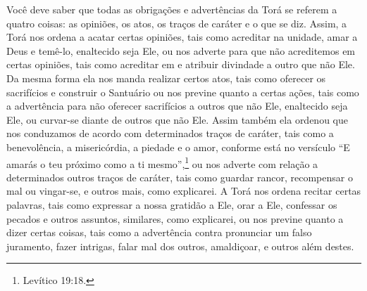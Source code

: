 Você deve saber que todas as obrigações e advertências da Torá se
referem a quatro coisas: as opiniões, os atos, os traços de caráter e o
que se diz. Assim, a Torá nos ordena a acatar certas opiniões, tais
como acreditar na unidade, amar a Deus e temê-lo, enaltecido seja Ele,
ou nos adverte para que não acreditemos em certas opiniões, tais como
acreditar em e atribuir divindade a outro que não Ele. Da mesma forma
ela nos manda realizar certos atos, tais como oferecer os sacrifícios e
construir o Santuário ou nos previne quanto a certas ações, tais como a
advertência para não oferecer sacrifícios a outros que não Ele,
enaltecido seja Ele, ou curvar-se diante de outros que não Ele. Assim
também ela ordenou que nos conduzamos de acordo com determinados traços
de caráter, tais como a benevolência, a misericórdia, a piedade e o
amor, conforme está no versículo ``E amarás o teu próximo como a ti
mesmo'',\footnote{Levítico 19:18.} ou nos adverte com relação a determinados
outros traços de caráter, tais como guardar rancor, recompensar o mal
ou vingar-se, e outros mais, como explicarei. A Torá nos ordena recitar
certas palavras, tais como expressar a nossa gratidão a Ele, orar a
Ele, confessar os pecados e outros assuntos,
similares, como explicarei, ou nos previne quanto a dizer certas coisas,
tais como a advertência contra pronunciar um falso juramento, fazer
intrigas, falar mal dos outros, amaldiçoar, e outros além destes.

